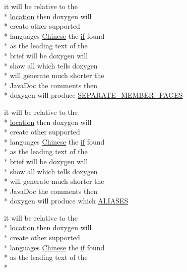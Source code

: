 \begin{DoxyCompactItemize}
\item 
it will be relative to the \\*
\hyperlink{glext_8h_a6f0165ed903f22b8bb600c3e0b628e73}{location} then doxygen will \\*
create other supported \\*
languages \hyperlink{sdlgamepad_8dox_ab6ff97d2e5e9fa61c208d5f0eee91c62}{Chinese} the \hyperlink{qxtdiscoverableservice_8cpp_aa620047247d7e2a6894ad8ad666771de}{if} found \\*
as the leading text of the \\*
brief will be doxygen will \\*
show all which tells doxygen \\*
will generate much shorter the \\*
Java\-Doc the comments then \\*
doxygen will produce \hyperlink{sdlgamepad_8dox_ad72e646b31fc3060000bd36feea98bbc}{S\-E\-P\-A\-R\-A\-T\-E\-\_\-\-M\-E\-M\-B\-E\-R\-\_\-\-P\-A\-G\-E\-S}
\item 
it will be relative to the \\*
\hyperlink{glext_8h_a6f0165ed903f22b8bb600c3e0b628e73}{location} then doxygen will \\*
create other supported \\*
languages \hyperlink{sdlgamepad_8dox_ab6ff97d2e5e9fa61c208d5f0eee91c62}{Chinese} the \hyperlink{qxtdiscoverableservice_8cpp_aa620047247d7e2a6894ad8ad666771de}{if} found \\*
as the leading text of the \\*
brief will be doxygen will \\*
show all which tells doxygen \\*
will generate much shorter the \\*
Java\-Doc the comments then \\*
doxygen will produce which \hyperlink{sdlgamepad_8dox_abb9f86499ee6f16a13b6e814f450db18}{A\-L\-I\-A\-S\-E\-S}
\item 
it will be relative to the \\*
\hyperlink{glext_8h_a6f0165ed903f22b8bb600c3e0b628e73}{location} then doxygen will \\*
create other supported \\*
languages \hyperlink{sdlgamepad_8dox_ab6ff97d2e5e9fa61c208d5f0eee91c62}{Chinese} the \hyperlink{qxtdiscoverableservice_8cpp_aa620047247d7e2a6894ad8ad666771de}{if} found \\*
as the leading text of the \\*

\end{DoxyCompactItemize}

